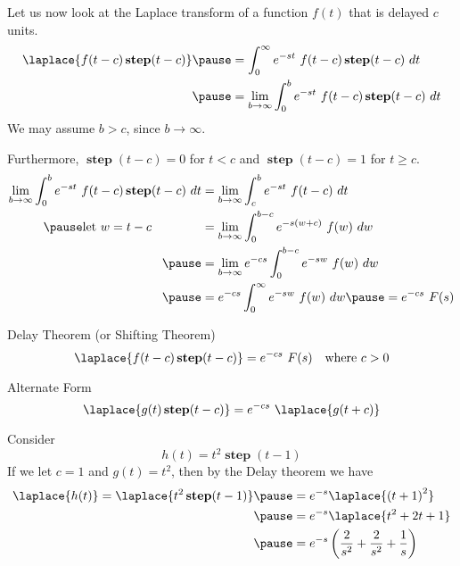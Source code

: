 \documentclass{beamer}
\DeclareMathOperator{\step}{\textbf{step}}
\begin{document}
\begin{frame}
\small
\begin{block}{}
Let us now look at the Laplace transform of a function $f(t)$ that is delayed $c$ units.
\begin{equation*}
\begin{aligned}
\laplace\{f(t-c)\step(t-c)\}\pause
&=\int_0^\infty e^{-st}~f(t-c)\step(t-c)~dt\\\pause
&=\lim_{b\rightarrow\infty}\int_0^b e^{-st}~f(t-c)\step(t-c)~dt
\end{aligned}
\end{equation*}\pause
We may assume $b>c$, since $b\rightarrow\infty$.\pause 

\vspace{2mm}
Furthermore, $\step(t-c)=0$ for $t<c$ and $\step(t-c)=1$ for $t\geq c$.\pause
\begin{equation*}
\begin{aligned}
\lim_{b\rightarrow\infty}\int_0^b e^{-st}~f(t-c)\step(t-c)~dt
&= \lim_{b\rightarrow\infty}\int_c^b e^{-st}~f(t-c)~dt\\\pause
\text{let $w=t-c$}\qquad\qquad&= \lim_{b\rightarrow\infty}\int_0^{b-c} e^{-s(w+c)}~f(w)~dw\\\pause
&=\lim_{b\rightarrow\infty}e^{-cs} \int_0^{b-c} e^{-sw}~f(w)~dw\\\pause
&=e^{-cs}\int_0^\infty e^{-sw}~f(w)~dw\pause
=e^{-cs}~F(s)
\end{aligned}
\end{equation*}
\end{block}
\end{frame}

\begin{frame}
\begin{block}{Delay Theorem (or Shifting Theorem)}
\begin{equation*}
\laplace\{f(t-c)\step(t-c)\}=e^{-cs}~F(s)
\quad\text{where}~c>0
\end{equation*}
\end{block}\pause
\begin{block}{Alternate Form}
\begin{equation*}
\laplace\{g(t)\step(t-c)\}=e^{-cs}~\laplace\{g(t+c)\}
\end{equation*}
\end{block}\pause
\begin{example}
Consider
\begin{equation*}
h(t)=t^2\step(t-1)
\end{equation*}\pause
If we let $c=1$ and $g(t)=t^2$, then by the Delay theorem we have
\begin{equation*}
\begin{aligned}
\laplace\{h(t)\}=\laplace\{t^2\step(t-1)\}\pause
&= e^{-s}\laplace\{{(t+1)}^2\}\\\pause
&= e^{-s}\laplace\{t^2+2t+1\}\\\pause
&= e^{-s}\left(\dfrac{2}{s^2}+\dfrac{2}{s^2}+\dfrac{1}{s}\right)
\end{aligned}
\end{equation*}
\end{example}
\end{frame}
\end{document}
